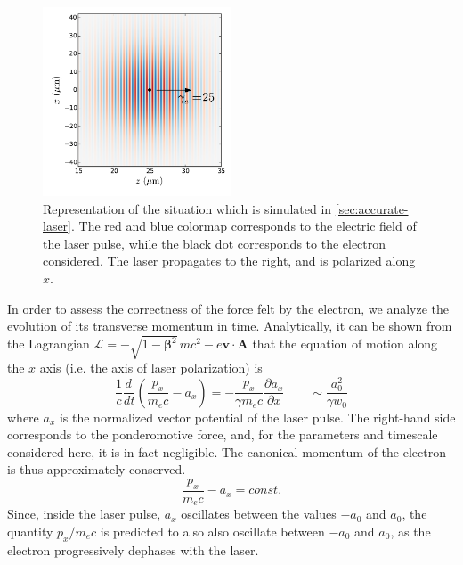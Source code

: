 \documentclass[1p,times]{elsarticle}
\renewcommand{\vec}[1]{\boldsymbol{#1}}
\begin{document}
\begin{figure}[!h]
\centering
\includegraphics[width=0.5\textwidth]{Schematic_laser.pdf}
\caption{\label{fig:Schematic_laser}Representation of the situation
  which is simulated in \cref{sec:accurate-laser}. The red and blue
  colormap corresponds to the electric field of the laser pulse, while
  the black dot corresponds to the electron considered. 
The laser propagates to the right, and is polarized along $x$.}
\end{figure}

In order to assess the correctness of the force felt by the electron,
we analyze the evolution of its transverse momentum in
time. Analytically, it can be shown from the Lagrangian 
$\mathcal{L} = - \sqrt{1-\vec{\beta}^2} \,mc^2 - e \vec{v} \cdot
\vec{A}$ that the equation of motion along the $x$ axis (i.e. the axis of laser polarization) is 
\begin{equation} \frac{1}{c}\frac{d \,}{dt} \left( \frac{p_x}{m_e c} - a_x \right) =
 - \frac{p_x}{\gamma m_e c}\frac{\partial a_x}{\partial x} \qquad \sim
\frac{a_0^2}{\gamma w_0} \end{equation}
\noindent where $a_x$ is the normalized vector potential of the laser
pulse. The right-hand side corresponds to the ponderomotive force, and,
for the parameters and timescale considered here, it is in fact
negligible. The canonical momentum of the
electron is thus approximately conserved.
\begin{equation} \frac{p_x}{m_e c} - a_x  = const. \end{equation}
\noindent Since, inside the laser pulse, $a_x$ oscillates between the values $-a_0$ and $a_0$,
the quantity $p_x/m_e c$ is predicted to also also oscillate
between $-a_0$ and $a_0$, as the electron progressively
dephases with the laser. 
\end{document}
